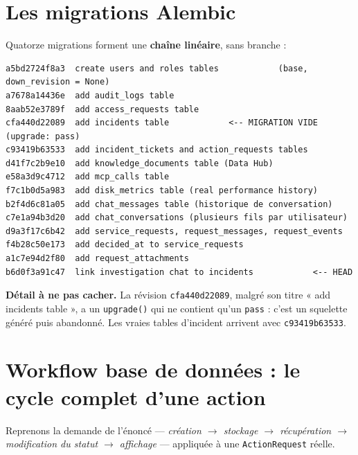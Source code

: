 \documentclass[11pt,a4paper]{report}
\newcommand{\file}[1]{\texttt{\small #1}}
\newcommand{\fn}[1]{\texttt{\small\textcolor{oasisviolet}{#1}}}
\newcommand{\cls}[1]{\texttt{\small\textcolor{oasisblue}{#1}}}
\newcommand{\arrowto}{\ensuremath{\rightarrow}}
\begin{document}
\section{Les migrations Alembic}

Quatorze migrations forment une \textbf{chaîne linéaire}, sans branche :

\begin{lstlisting}[caption={Ordre réel des révisions}]
a5bd2724f8a3  create users and roles tables            (base, down_revision = None)
a7678a14436e  add audit_logs table
8aab52e3789f  add access_requests table
cfa440d22089  add incidents table            <-- MIGRATION VIDE (upgrade: pass)
c93419b63533  add incident_tickets and action_requests tables
d41f7c2b9e10  add knowledge_documents table (Data Hub)
e58a3d9c4712  add mcp_calls table
f7c1b0d5a983  add disk_metrics table (real performance history)
b2f4d6c81a05  add chat_messages table (historique de conversation)
c7e1a94b3d20  add chat_conversations (plusieurs fils par utilisateur)
d9a3f17c6b42  add service_requests, request_messages, request_events
f4b28c50e173  add decided_at to service_requests
a1c7e94d2f80  add request_attachments
b6d0f3a91c47  link investigation chat to incidents            <-- HEAD
\end{lstlisting}

\begin{warnbox}
\textbf{Détail à ne pas cacher.} La révision \file{cfa440d22089}, malgré son
titre « add incidents table », a un \fn{upgrade()} qui ne contient qu'un
\texttt{pass} : c'est un squelette généré puis abandonné. Les vraies tables
d'incident arrivent avec \file{c93419b63533}.
\end{warnbox}

\section{Workflow base de données : le cycle complet d'une action}

Reprenons la demande de l'énoncé --- \emph{création \arrowto{} stockage
\arrowto{} récupération \arrowto{} modification du statut \arrowto{} affichage}
--- appliquée à une \cls{ActionRequest} réelle.
\end{document}
